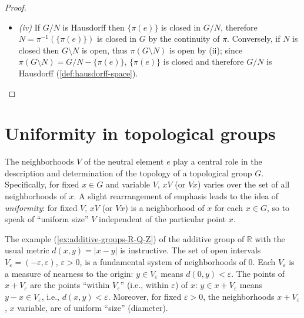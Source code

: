 \begin{proof}
\begin{itemize}
              It follows from (\ref{thm:topology-from-neighborhood-system}) that there exists a topology \(\tau\) on \(G/N\) compatible
              with the group structure, for which \(\pi(\mathcal{V})\) is the system of neighborhoods of \(\pi(e)\);
              since the \(\tau\)-neighborhoods of \(\pi(a)\) are the sets \(\pi(a)\pi(V)\) (\ref{cor:top-group-neighborhood-translation}),
              it follows from (iii) that \(\tau\) coincides with the quotient topology.
        \item \textit{(iv)} If \(G/N\) is Hausdorff then \(\{\pi(e)\}\) is closed in \(G/N\),
              therefore \(N = \pi^{-1}(\{\pi(e)\})\) is closed in \(G\) by the continuity of \(\pi\).
              Conversely, if \(N\) is closed then \(G \setminus N\) is open, thus \(\pi(G \setminus N)\) is open by (ii);
              since \(\pi(G \setminus N) = G/N - \{\pi(e)\}\), \(\{\pi(e)\}\) is closed and therefore \(G/N\) is Hausdorff (\ref{def:hausdorff-space}).
    \end{itemize}







\end{proof}


\section{Uniformity in topological groups}

The neighborhoods \( V \) of the neutral element \( e \) play a central role in the description and determination of the topology of a topological group \( G \). Specifically, for fixed \( x \in G \) and variable \( V \), \( xV \) (or \( Vx \)) varies over the set of all neighborhoods of \( x \). A slight rearrangement of emphasis leads to the idea of \emph{uniformity}: for fixed \( V \), \( xV \) (or \( Vx \)) is a neighborhood of \( x \) for each \( x \in G \), so to speak of “uniform size” \( V \) independent of the particular point \( x \).

The example (\ref{ex:additive-groups-R-Q-Z}) of the additive group of \( \mathbb{R} \) with the usual metric \( d(x, y) = |x - y| \) is instructive. The set of open intervals \( V_\varepsilon = (-\varepsilon, \varepsilon) \), \( \varepsilon > 0 \), is a fundamental system of neighborhoods of \( 0 \). Each \( V_\varepsilon \) is a measure of nearness to the origin: \( y \in V_\varepsilon \) means \( d(0, y) < \varepsilon \). The points of \( x + V_\varepsilon \) are the points “within \( V_\varepsilon \)” (i.e., within \( \varepsilon \)) of \( x \): \( y \in x + V_\varepsilon \) means \( y - x \in V_\varepsilon \), i.e., \( d(x, y) < \varepsilon \). Moreover, for fixed \( \varepsilon > 0 \), the neighborhoods \( x + V_\varepsilon \), \( x \) variable, are of uniform “size” (diameter).

